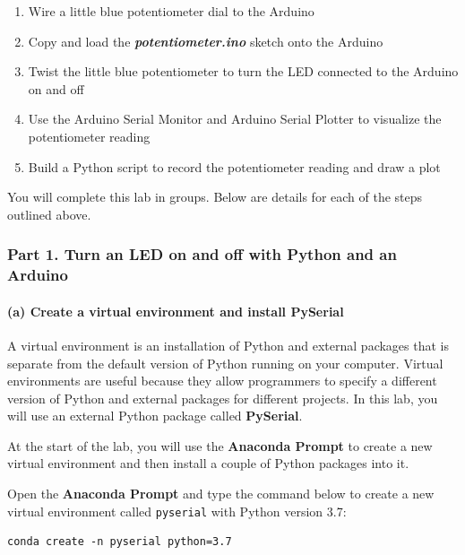 \documentclass[11pt]{article}
\begin{document}
\begin{enumerate}
\def\labelenumi{(\alph{enumi})}
\item
  Wire a little blue potentiometer dial to the Arduino
\item
  Copy and load the \textbf{\emph{potentiometer.ino}} sketch onto the
  Arduino
\item
  Twist the little blue potentiometer to turn the LED connected to the
  Arduino on and off
\item
  Use the Arduino Serial Monitor and Arduino Serial Plotter to visualize
  the potentiometer reading
\item
  Build a Python script to record the potentiometer reading and draw a
  plot
\end{enumerate}

    You will complete this lab in groups. Below are details for each of the
steps outlined above.

\hypertarget{part-1.-turn-an-led-on-and-off-with-python-and-an-arduino}{%
\subsubsection{Part 1. Turn an LED on and off with Python and an
Arduino}\label{part-1.-turn-an-led-on-and-off-with-python-and-an-arduino}}

    \hypertarget{a-create-a-virtual-environment-and-install-pyserial}{%
\paragraph{(a) Create a virtual environment and install
PySerial}\label{a-create-a-virtual-environment-and-install-pyserial}}

A virtual environment is an installation of Python and external packages
that is separate from the default version of Python running on your
computer. Virtual environments are useful because they allow programmers
to specify a different version of Python and external packages for
different projects. In this lab, you will use an external Python package
called \textbf{PySerial}.

At the start of the lab, you will use the \textbf{Anaconda Prompt} to
create a new virtual environment and then install a couple of Python
packages into it.

Open the \textbf{Anaconda Prompt} and type the command below to create a
new virtual environment called \texttt{pyserial} with Python version
3.7:

\begin{verbatim}
conda create -n pyserial python=3.7
\end{verbatim}
\end{document}
